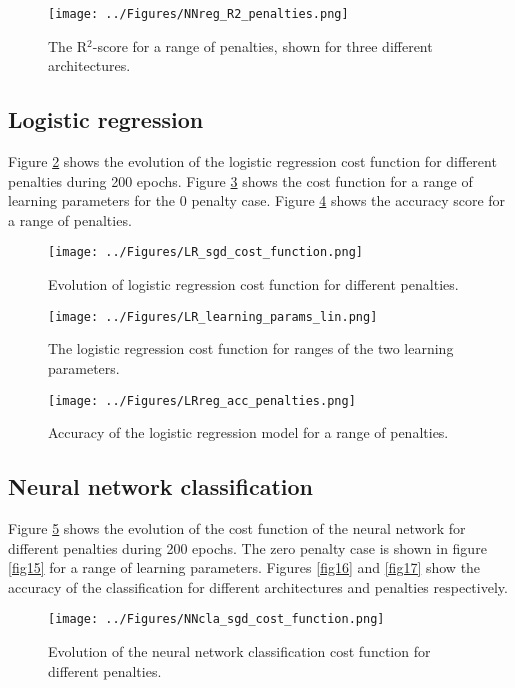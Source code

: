 \documentclass[notitlepage, reprint, nofootinbib]{revtex4-1}
\begin{document}
\begin{figure}
	\centering 
	\texttt{[image: ../Figures/NNreg\_R2\_penalties.png]}
	\caption{The R$^2$-score for a range of penalties, shown for three different architectures.}
	\label{fig10}
\end{figure}

\subsection{Logistic regression}
Figure \ref{fig11} shows the evolution of the logistic regression cost function for different penalties during 200 epochs. Figure \ref{fig12} shows the cost function for a range of learning parameters for the 0 penalty case. Figure \ref{fig13} shows the accuracy score for a range of penalties.

\begin{figure}
	\centering 
	\texttt{[image: ../Figures/LR\_sgd\_cost\_function.png]}
	\caption{Evolution of logistic regression cost function for different penalties.}
	\label{fig11}
\end{figure}

\begin{figure}
	\centering 
	\texttt{[image: ../Figures/LR\_learning\_params\_lin.png]}
	\caption{The logistic regression cost function for ranges of the two learning parameters.}
	\label{fig12}
\end{figure}

\begin{figure}
	\centering 
	\texttt{[image: ../Figures/LRreg\_acc\_penalties.png]}
	\caption{Accuracy of the logistic regression model for a range of penalties.}
	\label{fig13}
\end{figure}

\subsection{Neural network classification}
Figure \ref{fig14} shows the evolution of the cost function of the neural network for different penalties during 200 epochs. The zero penalty case is shown in figure \ref{fig15} for a range of learning parameters. Figures \ref{fig16} and \ref{fig17} show the accuracy of the classification for different architectures and penalties respectively.


\begin{figure}
	\centering 
	\texttt{[image: ../Figures/NNcla\_sgd\_cost\_function.png]}
	\caption{Evolution of the neural network classification cost function for different penalties.}
	\label{fig14}
\end{figure}
\end{document}
